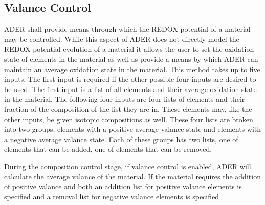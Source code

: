 \documentclass[12pt]{article}
\begin{document}
\subsection{Valance Control}
ADER shall provide means through which the REDOX potential of a material may
be controlled. While this aspect of ADER does not directly model the REDOX
potential evolution of a material it allows the user to set the oxidation
state of elements in the material as well as provide a means by which ADER
can maintain an average oxidation state in the material. This method takes up
to five inputs. The first input is required if the other possible
 four inputs are
desired to be used. The first input is a list of all elements and their
average oxidation state in the material.
 The following four inputs are four lists
of elements and their fraction of the composition of the list they are in.
These elements may, like the other inputs, be given isotopic compositions as
well.
These four lists are broken into two groups, elements with a positive average
valance state and elements with a negative average valance state. Each of these
groups has two lists, one of elements that can be added, one of elements that
can be removed. \par
During the composition control stage, if valance control is enabled,
ADER will calculate the average valance of the material. 
If the material
requires the addition of positive valance and both an addition list for
positive valance elements is specified and a removal list for negative valance
elements is specified 
\end{document}
